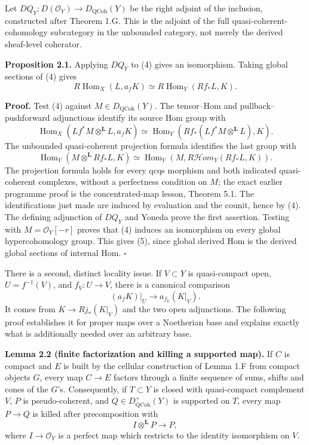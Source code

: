 \documentclass[11pt]{article}
\begin{document}
Let \(DQ_Y:D(\mathcal O_Y)\to D_{\mathrm{QCoh}}(Y)\) be the right
adjoint of the inclusion, constructed after Theorem 1.G. This is the
adjoint of the full quasi-coherent-cohomology subcategory in the
unbounded category, not merely the derived sheaf-level coherator.

\textbf{Proposition 2.1.} Applying \(DQ_Y\) to (4) gives an isomorphism.
Taking global sections of (4) gives \[
R\operatorname{Hom}_X(L,a_fK)
 \simeq R\operatorname{Hom}_Y(Rf_*L,K).
\tag{5}
\]

\textbf{Proof.} Test (4) against \(M\in D_{\mathrm{QCoh}}(Y)\). The
tensor--Hom and pullback--pushforward adjunctions identify its source
Hom group with \[
\operatorname{Hom}_X(Lf^*M\otimes^{\mathbf L}L,a_fK)
 \simeq
\operatorname{Hom}_Y(Rf_*(Lf^*M\otimes^{\mathbf L}L),K).
\] The unbounded quasi-coherent projection formula identifies the last
group with \[
\operatorname{Hom}_Y(M\otimes^{\mathbf L}Rf_*L,K)
 \simeq
\operatorname{Hom}_Y(M,R\mathcal H om_Y(Rf_*L,K)).
\] The projection formula holds for every qcqs morphism and both
indicated quasi-coherent complexes, without a perfectness condition on
\(M\); the exact earlier programme proof is the concentrated-map lesson,
Theorem 5.1. The identifications just made are induced by evaluation and
the counit, hence by (4). The defining adjunction of \(DQ_Y\) and Yoneda
prove the first assertion. Testing with \(M=\mathcal O_Y[-r]\) proves
that (4) induces an isomorphism on every global hypercohomology group.
This gives (5), since global derived Hom is the derived global sections
of internal Hom. \(\square\)

There is a second, distinct locality issue. If \(V\subset Y\) is
quasi-compact open, \(U=f^{-1}(V)\), and \(f_V:U\to V\), there is a
canonical comparison \[
(a_fK)|_U\longrightarrow a_{f_V}(K|_V).
\tag{6}
\] It comes from \(K\to Rj_*(K|_V)\) and the two open adjunctions. The
following proof establishes it for proper maps over a Noetherian base
and explains exactly what is additionally needed over an arbitrary base.

\textbf{Lemma 2.2 (finite factorization and killing a supported map).}
If \(C\) is compact and \(E\) is built by the cellular construction of
Lemma 1.F from compact objects \(G\), every map \(C\to E\) factors
through a finite sequence of sums, shifts and cones of the \(G\)'s.
Consequently, if \(T\subset Y\) is closed with quasi-compact complement
\(V\), \(P\) is pseudo-coherent, and \(Q\in D^+_{\mathrm{QCoh}}(Y)\) is
supported on \(T\), every map \(P\to Q\) is killed after precomposition
with \[
I\otimes^{\mathbf L}P\longrightarrow P,
\tag{2.A}
\] where \(I\to\mathcal O_Y\) is a perfect map which restricts to the
identity isomorphism on \(V\).
\end{document}
